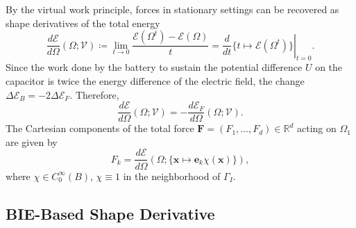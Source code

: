 \documentclass{article}
\theoremstyle{remark}
\newcommand{\x}{\boldsymbol{x}}
\newcommand{\mat}[1]{\mathbf{#1}}
\newcommand{\Eps}{\mathcal{E}}
\newcommand{\Nu}{\mathcal{V}}
\begin{document}
By the virtual work principle, forces in stationary settings can be recovered as shape derivatives of the total energy
\begin{equation}
    \frac{d\Eps}{d\Omega}(\Omega;\Nu)\coloneqq\lim_{t\to 0}\frac{\Eps(\Omega^t)-\Eps(\Omega)}{t}=\left.\frac{d}{dt}\{t\mapsto\Eps(\Omega^t)\}\right|_{t=0}.
\end{equation}
Since the work done by the battery to sustain the potential difference $U$ on the capacitor is twice the energy difference of the electric field, the change $\Delta\Eps_B=-2\Delta\Eps_F$. Therefore,
\begin{equation}
    \frac{d\Eps}{d\Omega}(\Omega;\Nu)=-\frac{d\Eps_F}{d\Omega}(\Omega;\Nu).
\end{equation}
The Cartesian components of the total force $\mat{F}=(F_1,\dots,F_d)\in\mathbb{R}^d$ acting on $\Omega_1$ are given by
\begin{equation}
    F_k=\frac{d\Eps}{d\Omega}(\Omega;\{\x\mapsto\mat{e}_k\chi(\x)\}),
\end{equation}
where $\chi\in C_0^\infty(B)$, $\chi\equiv 1$ in the neighborhood of $\Gamma_I$.

\subsection{BIE-Based Shape Derivative}
\end{document}
